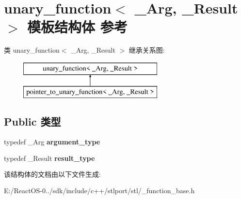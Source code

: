 \hypertarget{structunary__function}{}\section{unary\+\_\+function$<$ \+\_\+\+Arg, \+\_\+\+Result $>$ 模板结构体 参考}
\label{structunary__function}
类 unary\+\_\+function$<$ \+\_\+\+Arg, \+\_\+\+Result $>$ 继承关系图\+:\begin{figure}[H]
\begin{center}
\leavevmode
\includegraphics[height=2.000000cm]{structunary__function}
\end{center}
\end{figure}
\subsection*{Public 类型}
\begin{DoxyCompactItemize}
\item 
\mbox{\label{structunary__function_abba3a1e22e2a8e3a379518f45ff157d8}} 
typedef \+\_\+\+Arg {\bfseries argument\+\_\+type}
\item 
\mbox{\label{structunary__function_abdad92e114e63acbf7c5bd419f15e2af}} 
typedef \+\_\+\+Result {\bfseries result\+\_\+type}
\end{DoxyCompactItemize}


该结构体的文档由以下文件生成\+:\begin{DoxyCompactItemize}
\item 
E\+:/\+React\+O\+S-\/0../sdk/include/c++/stlport/stl/\+\_\+function\+\_\+base.\+h\end{DoxyCompactItemize}
